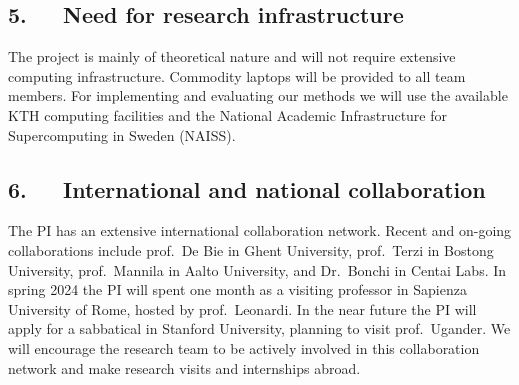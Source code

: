 \documentclass[a4paper,11pt]{article}
\begin{document}
\vspace{-1mm}
\subsection*{5.~~~Need for research infrastructure}
\vspace{-1mm}


The project is mainly of theoretical nature and will not require extensive computing infrastructure. 
Commodity laptops will be provided to all team members. 
For implementing and evaluating our methods we will use the available 
KTH computing facilities
and the National Academic Infrastructure for Supercomputing in Sweden (NAISS).

\vspace{-1mm}
\subsection*{6.~~~International and national collaboration}
\vspace{-1mm}


The PI has an extensive international collaboration network. 
Recent and on-going collaborations include
prof.\ De Bie in Ghent University, 
prof.\ Terzi in Bostong University,
prof.\ Mannila in Aalto University, and 
Dr.\ Bonchi in Centai Labs.
In spring 2024 the PI will spent one month as a visiting professor 
in Sapienza University of Rome, hosted by prof.\ Leonardi.
In the near future the PI will apply for a sabbatical in Stanford University, 
planning to visit prof.\ Ugander. 
We will encourage the research team to be actively involved in this collaboration network
and make research visits and internships abroad.


{\footnotesize
\setlength{\bibsep}{0pt}


}

% 
\end{document}
